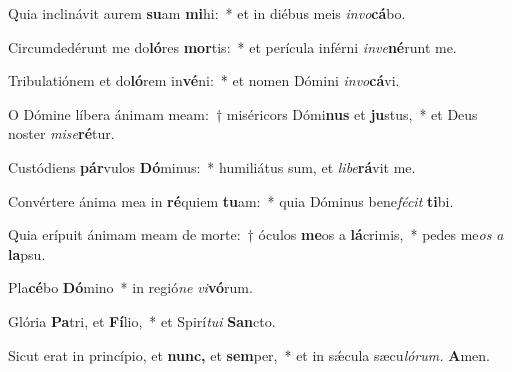 \item Quia inclinávit aurem \textbf{su}am \textbf{mi}hi:~* et in diébus meis \textit{invo}\textbf{cá}bo.
\item Circumdedérunt me do\textbf{ló}res \textbf{mor}tis:~* et perícula inférni \textit{inve}\textbf{né}runt me.
\item Tribulatiónem et do\textbf{ló}rem in\textbf{vé}ni:~* et nomen Dómini \textit{in}\textit{vo}\textbf{cá}vi.
\item O Dómine líbera ánimam meam:~† miséricors Dómi\textbf{nus} et \textbf{ju}stus,~* et Deus noster \textit{mise}\textbf{ré}tur.
\item Custódiens \textbf{pár}vulos \textbf{Dó}minus:~* humiliátus sum, et \textit{libe}\textbf{rá}vit me.
\item Convértere ánima mea in \textbf{ré}quiem \textbf{tu}am:~* quia Dóminus bene\textit{fécit} \textbf{ti}bi.
\item Quia erípuit ánimam meam de morte:~† óculos \textbf{me}os a \textbf{lá}crimis,~* pedes me\hspace{0.03em}\textit{os} \textit{a} \textbf{la}psu.
\item Pla\textbf{cé}bo \textbf{Dó}mino~* in regió\textit{ne} \textit{vi}\textbf{vó}rum.
\item Glória \textbf{Pa}tri, et \textbf{Fí}lio,~* et Spirí\hspace{0.03em}\textit{tui} \textbf{San}cto.
\item Sicut erat in princípio, et \textbf{nunc,} et \textbf{sem}per,~* et in sǽcula sæcu\hspace{0.03em}\textit{lórum.} \textbf{A}men.